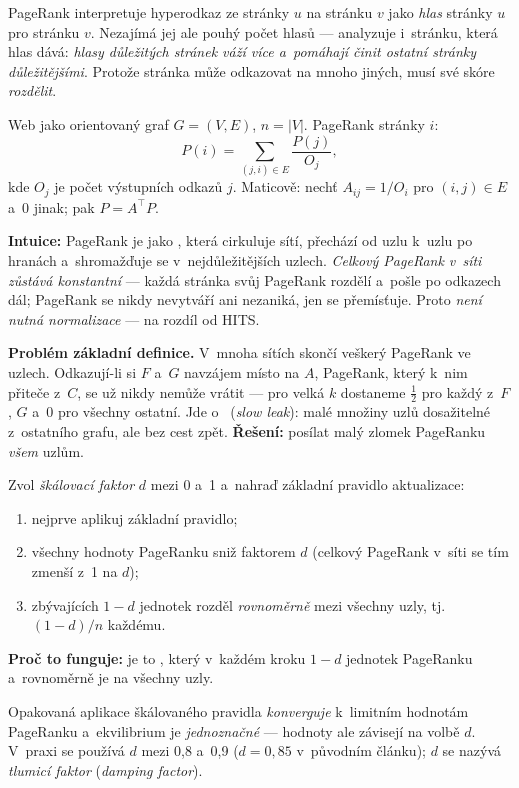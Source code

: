 \documentclass[11pt,a4paper]{article}
\theoremstyle{definition}
\begin{document}
\begin{defbox}
PageRank interpretuje hyperodkaz ze stránky $u$ na stránku $v$ jako \emph{hlas} stránky $u$ pro
stránku $v$. Nezajímá jej ale pouhý počet hlasů --- analyzuje i~stránku, která hlas dává:
\emph{hlasy důležitých stránek váží více a~pomáhají činit ostatní stránky důležitějšími}.
Protože stránka může odkazovat na mnoho jiných, musí své skóre \emph{rozdělit}.

Web jako orientovaný graf $G=(V,E)$, $n=|V|$. PageRank stránky $i$:
\[ P(i)=\sum_{(j,i)\in E}\frac{P(j)}{O_j}, \]
kde $O_j$ je počet výstupních odkazů $j$. Maticově: nechť $A_{ij}=1/O_i$ pro $(i,j)\in E$
a~0 jinak; pak $P=A^{\!\top}P$.

\textbf{Intuice:} PageRank je jako , která cirkuluje sítí, přechází od uzlu
k~uzlu po hranách a~shromažďuje se v~nejdůležitějších uzlech. \emph{Celkový PageRank v~síti
zůstává konstantní} --- každá stránka svůj PageRank rozdělí a~pošle po odkazech dál; PageRank
se nikdy nevytváří ani nezaniká, jen se přemísťuje. Proto \emph{není nutná normalizace} ---
na rozdíl od HITS.
\end{defbox}

\textbf{Problém základní definice.} V~mnoha sítích skončí veškerý PageRank ve 
uzlech. Odkazují-li si $F$ a~$G$ navzájem místo na $A$, PageRank, který k~nim přiteče z~$C$, se
už nikdy nemůže vrátit --- pro velká $k$ dostaneme $\frac12$ pro každý z~$F$, $G$ a~0 pro
všechny ostatní. Jde o~ (\emph{slow leak}): malé množiny uzlů dosažitelné
z~ostatního grafu, ale bez cest zpět. \textbf{Řešení:} posílat malý zlomek PageRanku
\emph{všem} uzlům.

\begin{defbox}
Zvol \emph{škálovací faktor} $d$ mezi 0 a~1 a~nahraď základní pravidlo aktualizace:
\begin{enumerate}
\item nejprve aplikuj základní pravidlo;
\item všechny hodnoty PageRanku sniž faktorem $d$ (celkový PageRank v~síti se tím zmenší
      z~1 na $d$);
\item zbývajících $1-d$ jednotek rozděl \emph{rovnoměrně} mezi všechny uzly, tj.\ $(1-d)/n$
      každému.
\end{enumerate}
\textbf{Proč to funguje:} je to , který v~každém kroku $1-d$ jednotek
PageRanku  a~rovnoměrně je  na všechny uzly.

Opakovaná aplikace škálovaného pravidla \emph{konverguje} k~limitním hodnotám PageRanku
a~ekvilibrium je \emph{jednoznačné} --- hodnoty ale závisejí na volbě $d$. V~praxi se používá
$d$ mezi 0,8 a~0,9 ($d=0{,}85$ v~původním článku); $d$ se nazývá \emph{tlumicí faktor}
(\emph{damping factor}).
\end{defbox}
\end{document}
